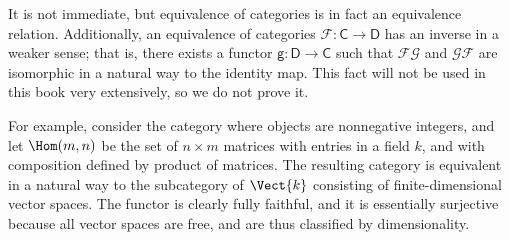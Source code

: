 It is not immediate, but equivalence of categories is in fact an equivalence relation. Additionally, an equivalence of categories $\mathscr{F} : \mathsf{C}  \to \mathsf{D} $ has an inverse in a weaker sense; that is, there exists a functor $\mathsf{g} : \mathsf{D}  \to \mathsf{C} $ such that $\mathscr{F} \mathscr{G} $ and $\mathscr{G} \mathscr{F} $ are isomorphic in a natural way to the identity map. This fact will not be used in this book very extensively, so we do not prove it.

For example, consider the category where objects are nonnegative integers, and let $\Hom(m, n) $ be the set of $n\times m$ matrices with entries in a field $k$, and with composition defined by product of matrices. The resulting category is equivalent in a natural way to the subcategory of $\Vect{k} $ consisting of finite-dimensional vector spaces. The functor is clearly fully faithful, and it is essentially surjective because all vector spaces are free, and are thus classified by dimensionality.

